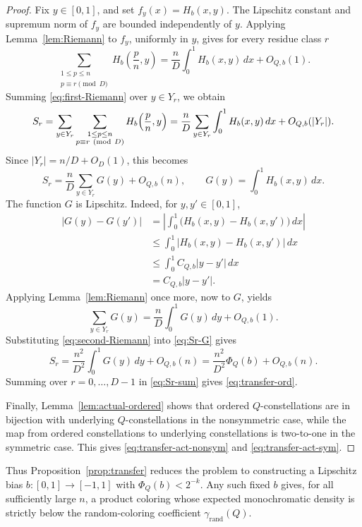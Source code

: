 \documentclass[twoside,12pt]{article}
\newcommand{\rand}{\mathrm{rand}}
\newcommand{\1}{\mathbf 1}
\begin{document}
\begin{proof}
Fix \(y\in[0,1]\), and set \(f_y(x)=H_b(x,y)\).  The Lipschitz constant and
supremum norm of \(f_y\) are bounded independently of \(y\).  Applying
Lemma~\ref{lem:Riemann} to \(f_y\), uniformly in \(y\), gives for every
residue class \(r\)
\begin{equation}\label{eq:first-Riemann}
\sum_{\substack{1\le p\le n\\ p\equiv r\pmod D}}
H_b\!\left(\frac pn,y\right)
=
\frac{n}{D}\int_0^1H_b(x,y)\,dx+O_{Q,b}(1).
\end{equation}
Summing \eqref{eq:first-Riemann} over \(y\in Y_r\), we obtain
\[
S_r=
\sum_{y\in Y_r}\sum_{\substack{1\le p\le n\\ p\equiv r\ ({\rm mod}\ D)}} H_b\!\left(\frac pn,y\right)
=
\frac{n}{D}\sum_{y\in Y_r}\int_0^1 H_b(x,y)\,dx+O_{Q,b}(|Y_r|).
\]
Since \(|Y_r|=n/D+O_D(1)\), this becomes
\begin{equation}\label{eq:Sr-G}
S_r
=
\frac{n}{D}\sum_{y\in Y_r}G(y)+O_{Q,b}(n),
\qquad
G(y)=\int_0^1H_b(x,y)\,dx.
\end{equation}
The function \(G\) is Lipschitz.  Indeed, for \(y,y'\in[0,1]\),
\[
\begin{aligned}
|G(y)-G(y')|
&=\left|\int_0^1\bigl(H_b(x,y)-H_b(x,y')\bigr)\,dx\right|\\
&\le \int_0^1|H_b(x,y)-H_b(x,y')|\,dx\\
&\le \int_0^1 C_{Q,b}|y-y'|\,dx\\
&=C_{Q,b}|y-y'|.
\end{aligned}
\]
Applying Lemma~\ref{lem:Riemann} once more, now to \(G\), yields
\begin{equation}\label{eq:second-Riemann}
\sum_{y\in Y_r}G(y)
=
\frac{n}{D}\int_0^1G(y)\,dy+O_{Q,b}(1).
\end{equation}
Substituting \eqref{eq:second-Riemann} into \eqref{eq:Sr-G} gives
\[
S_r
=
\frac{n^2}{D^2}\int_0^1G(y)\,dy+O_{Q,b}(n)
=
\frac{n^2}{D^2}\Phi_Q(b)+O_{Q,b}(n).
\]
Summing over \(r=0,\dots,D-1\) in \eqref{eq:Sr-sum} gives
\eqref{eq:transfer-ord}.

Finally, Lemma~\ref{lem:actual-ordered} shows that ordered
\(Q\)-constellations are in bijection with underlying \(Q\)-constellations in
the nonsymmetric case, while the map from ordered constellations to underlying
constellations is two-to-one in the symmetric case.  This gives
\eqref{eq:transfer-act-nonsym} and \eqref{eq:transfer-act-sym}.
\end{proof}


Thus Proposition~\ref{prop:transfer} reduces the problem to constructing a
Lipschitz bias \(b:[0,1]\to[-1,1]\) with \(\Phi_Q(b)<2^{-k}\).  Any such fixed
\(b\) gives, for all sufficiently large \(n\), a product coloring whose
expected monochromatic density is strictly below the random-coloring
coefficient \(\gamma_{\rand}(Q)\).
\end{document}
